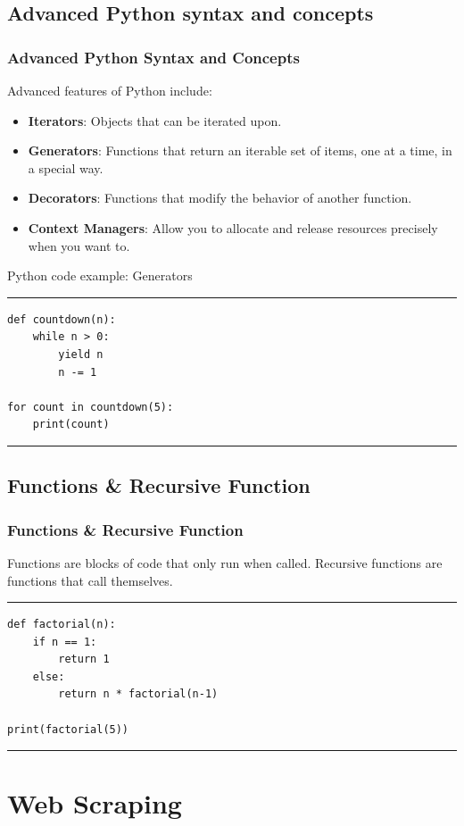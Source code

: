 \documentclass[aspectratio=169, hideothersubsections]{beamer}
\begin{document}
\subsection{Advanced Python syntax and concepts}
\begin{frame}
\frametitle{Advanced Python Syntax and Concepts}
Advanced features of Python include:
\begin{itemize}
    \item \textbf{Iterators}: Objects that can be iterated upon.
    \item \textbf{Generators}: Functions that return an iterable set of items, one at a time, in a special way.
    \item \textbf{Decorators}: Functions that modify the behavior of another function.
    \item \textbf{Context Managers}: Allow you to allocate and release resources precisely when you want to.
\end{itemize}
\end{frame}

\begin{frame}[fragile]{Python code example: Generators}
\rule{\textwidth}{1pt}
\scriptsize
\begin{verbatim}
def countdown(n):
    while n > 0:
        yield n
        n -= 1

for count in countdown(5):
    print(count)
\end{verbatim}
\rule{\textwidth}{1pt}
\end{frame}

\subsection{Functions \& Recursive Function}
\begin{frame}[fragile]
\frametitle{Functions \& Recursive Function}
Functions are blocks of code that only run when called. Recursive functions are functions that call themselves.
\rule{\textwidth}{1pt}
\scriptsize
\begin{verbatim}
def factorial(n):
    if n == 1:
        return 1
    else:
        return n * factorial(n-1)

print(factorial(5))
\end{verbatim}
\rule{\textwidth}{1pt}
\end{frame}

\section{Web Scraping}
\end{document}
